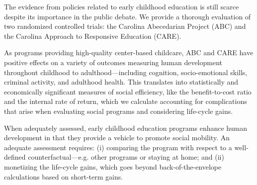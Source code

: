The evidence from policies related to early childhood education is still scarce despite its importance in the public debate. We provide a thorough evaluation of two randomized controlled trials: the Carolina Abecedarian Project (ABC) and the Carolina Approach to Responsive Education (CARE).

As programs providing high-quality center-based childcare, ABC and CARE have positive effects on a variety of outcomes measuring human development throughout childhood to adulthood---including cognition, socio-emotional skills, criminal activity, and adulthood health. This translates into statistically and economically significant measures of social efficiency, like the benefit-to-cost ratio and the internal rate of return, which we calculate accounting for complications that arise when evaluating social programs and considering life-cycle gains.

When adequately assessed, early childhood education programs enhance human development in that they provide a vehicle to promote social mobility. An adequate assessment requires: (i) comparing the program with respect to a well-defined counterfactual---e.g. other programs or staying at home; and (ii) monetizing the life-cycle gains, which goes beyond back-of-the-envelope calculations based on short-term gains.

\clearpage

\singlespace



 